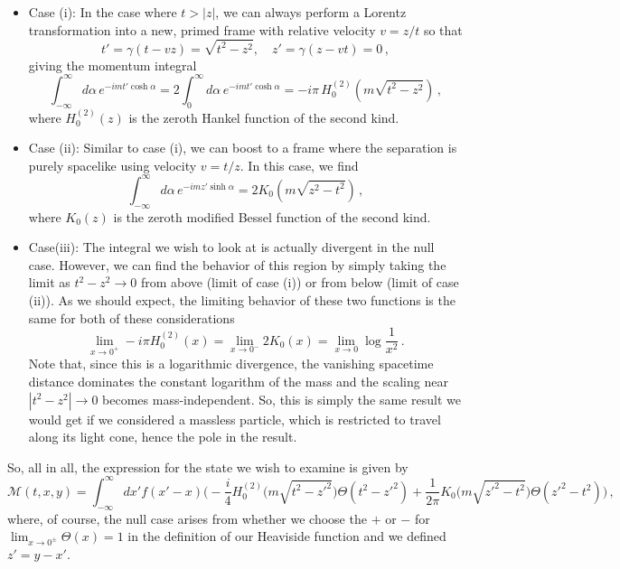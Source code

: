 \documentclass{article}
\numberwithin{equation}{subsection}
\begin{document}
\begin{itemize}
    \item Case (i): In the case where $t > |z|$, we can always perform a Lorentz transformation into a new, primed frame with relative velocity $v = z/t$ so that
    \begin{equation}
        t' = \gamma(t - vz) = \sqrt{t^2 - z^2}, \quad z' = \gamma(z - v t) = 0\,,
    \end{equation}
    giving the momentum integral
    \begin{equation}
        \int_{-\infty}^{\infty} d\alpha\,e^{-imt'\cosh\alpha} = 2\int_0^\infty d\alpha\,e^{-i mt'\cosh\alpha} = -i\pi\,H_0^{(2)}(m\sqrt{t^2 - z^2})\,,
    \end{equation}
    where $H_0^{(2)}(z)$ is the zeroth Hankel function of the second kind.
    \item Case (ii): Similar to case (i), we can boost to a frame where the separation is purely spacelike using velocity $v = t/z$. In this case, we find
    \begin{equation}
        \int_{-\infty}^{\infty} d\alpha\,e^{-imz'\sinh\alpha} = 2K_0(m\sqrt{z^2 - t^2})\,,
    \end{equation}
    where $K_0(z)$ is the zeroth modified Bessel function of the second kind.
    \item Case(iii): The integral we wish to look at is actually divergent in the null case. However, we can find the behavior of this region by simply 
	    taking the limit as $t^2 - z^2 \to 0$ from above (limit of case (i)) or from below (limit of case (ii)). As we should expect, the limiting behavior 
		of these two functions is the same for both of these considerations
    \begin{equation}
        \lim_{x\to0^+}-i\pi H_0^{(2)}(x) = \lim_{x\to0^-}2K_0(x) = \lim_{x\to 0}\log\frac{1}{x^2}\,.
    \end{equation}
    Note that, since this is a logarithmic divergence, the vanishing spacetime distance dominates the constant logarithm of the mass and the scaling near $|t^2 - z^2|\to 0$ 
	becomes mass-independent. So, this is simply the same result we would get if we considered a massless particle, which is restricted to travel along its light cone, hence the pole in the result.
\end{itemize}
So, all in all, the expression for the state we wish to examine is given by
\begin{equation}\label{eq:finResKG}
    \mathcal{M}(t, x, y) = \int_{-\infty}^\infty dx'f(x' - x)\Big(-\frac{i}{4}H_0^{(2)}\big(m\sqrt{t^2 - z'^2}\big)\Theta(t^2 - z'^2) + \frac{1}{2\pi}K_0\big(m\sqrt{z'^2 - t^2}\big)\Theta(z'^2 - t^2)\Big)\,,
\end{equation}
where, of course, the null case arises from whether we choose the $+$ or $-$ for $\lim_{x\to 0^\pm}\Theta(x) = 1$ in the definition of our Heaviside function and we defined $z' = y - x'$.
\end{document}
